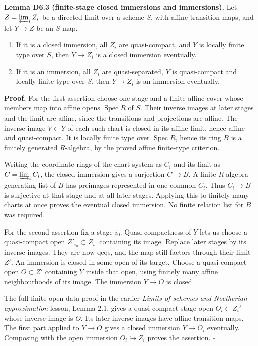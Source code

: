 \documentclass[11pt,a4paper,openany]{report}
\providecommand{\tightlist}{\setlength{\itemsep}{0pt}\setlength{\parskip}{0pt}}
\begin{document}
\textbf{Lemma D6.3 (finite-stage closed immersions and immersions).} Let \(Z=\varprojlim_i Z_i\) be a directed limit over a scheme \(S\), with affine transition maps, and let \(Y\to Z\) be an \(S\)-map.

\begin{enumerate}
\def\labelenumi{\arabic{enumi}.}
\tightlist
\item
  If it is a closed immersion, all \(Z_i\) are quasi-compact, and \(Y\) is locally finite type over \(S\), then \(Y\to Z_i\) is a closed immersion eventually.
\item
  If it is an immersion, all \(Z_i\) are quasi-separated, \(Y\) is quasi-compact and locally finite type over \(S\), then \(Y\to Z_i\) is an immersion eventually.
\end{enumerate}

\textbf{Proof.} For the first assertion choose one stage and a finite affine cover whose members map into affine opens \(\operatorname{Spec}R\) of \(S\). Their inverse images at later stages and the limit are affine, since the transitions and projections are affine. The inverse image \(V\subset Y\) of each such chart is closed in its affine limit, hence affine and quasi-compact. It is locally finite type over \(\operatorname{Spec}R\), hence its ring \(B\) is a finitely generated \(R\)-algebra, by the proved affine finite-type criterion.

Writing the coordinate rings of the chart system as \(C_i\) and its limit as \(C=\varinjlim_iC_i\), the closed immersion gives a surjection \(C\to B\). A finite \(R\)-algebra generating list of \(B\) has preimages represented in one common \(C_i\). Thus \(C_i\to B\) is surjective at that stage and at all later stages. Applying this to finitely many charts at once proves the eventual closed immersion. No finite relation list for \(B\) was required.

For the second assertion fix a stage \(i_0\). Quasi-compactness of \(Y\) lets us choose a quasi-compact open \(Z'_{i_0}\subset Z_{i_0}\) containing its image. Replace later stages by its inverse images. They are now qcqs, and the map still factors through their limit \(Z'\). An immersion is closed in some open of its target. Choose a quasi-compact open \(O\subset Z'\) containing \(Y\) inside that open, using finitely many affine neighbourhoods of its image. The immersion \(Y\to O\) is closed.

The full finite-open-data proof in the earlier \emph{Limits of schemes and Noetherian approximation} lesson, Lemma 2.1, gives a quasi-compact stage open \(O_i\subset Z_i'\) whose inverse image is \(O\). Its later inverse images have affine transition maps. The first part applied to \(Y\to O\) gives a closed immersion \(Y\to O_i\) eventually. Composing with the open immersion \(O_i\hookrightarrow Z_i\) proves the assertion. \(\square\)
\end{document}
